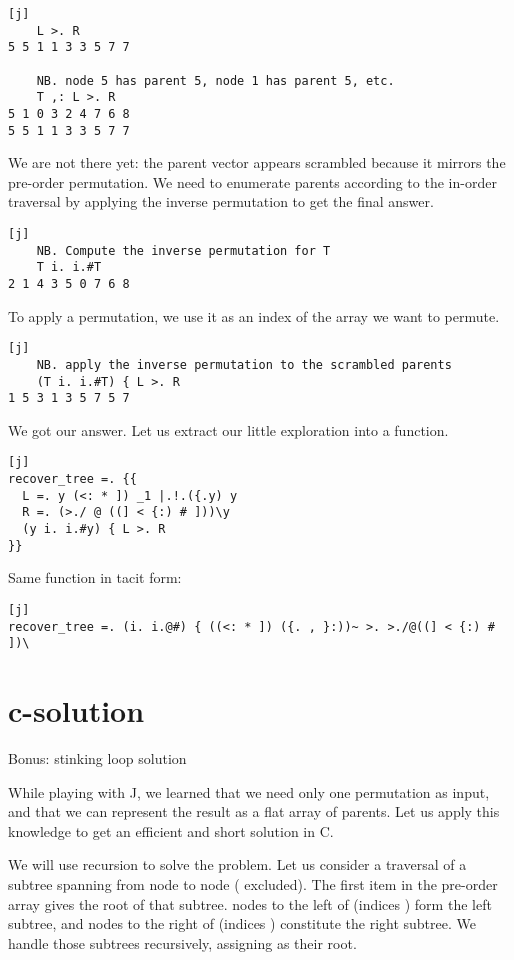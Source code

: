 \documentclass{article}
\begin{document}
\begin{verbatim}[j]
    L >. R
5 5 1 1 3 3 5 7 7

    NB. node 5 has parent 5, node 1 has parent 5, etc.
    T ,: L >. R
5 1 0 3 2 4 7 6 8
5 5 1 1 3 3 5 7 7
\end{verbatim}

We are not there yet: the parent vector appears scrambled because it mirrors the pre-order permutation.
We need to enumerate parents according to the in-order traversal by applying the inverse permutation to get the final answer.

\begin{verbatim}[j]
    NB. Compute the inverse permutation for T
    T i. i.#T
2 1 4 3 5 0 7 6 8
\end{verbatim}

To apply a permutation, we use it as an index of the array we want to permute.
\begin{verbatim}[j]
    NB. apply the inverse permutation to the scrambled parents
    (T i. i.#T) { L >. R
1 5 3 1 3 5 7 5 7
\end{verbatim}

We got our answer.
Let us extract our little exploration into a function.
\begin{verbatim}[j]
recover_tree =. {{
  L =. y (<: * ]) _1 |.!.({.y) y
  R =. (>./ @ ((] < {:) # ]))\y
  (y i. i.#y) { L >. R
}}
\end{verbatim}

Same function in tacit form:
\begin{verbatim}[j]
recover_tree =. (i. i.@#) { ((<: * ]) ({. , }:))~ >. >./@((] < {:) # ])\
\end{verbatim}

\section{c-solution}{Bonus: stinking loop solution}

While playing with J, we learned that we need only one permutation as input, and that we can represent the result as a flat array of parents.
Let us apply this knowledge to get an efficient and short solution in C.

We will use recursion to solve the problem.
Let us consider a traversal of a subtree spanning from node  to node  ( excluded).
The first item in the pre-order array gives the root  of that subtree.
\math{P - L} nodes to the left of  (indices \math{L..P}) form the left subtree, and  nodes to the right of  (indices ) constitute the right subtree.
We handle those subtrees recursively, assigning \math{P} as their root.
\end{document}
